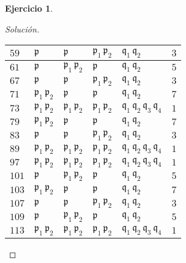 \documentclass{article}
\newcounter{tarea}
\theoremstyle{definition}
\newtheorem{ejercicio}{Ejercicio}[tarea]
\newenvironment{solucion}{\begin{proof}[Solución]}{\end{proof}}
\begin{document}
\begin{ejercicio}
\begin{solucion}
\begin{center}
\begin{tabular}{x{1cm}x{1.5cm}x{1.5cm}x{1.5cm}x{1.5cm}x{1cm}}
\hline
$59$ & $\mathfrak{p}$ & $\mathfrak{p}$ & $\mathfrak{p}_1\,\mathfrak{p}_2$ & $\mathfrak{q}_1\,\mathfrak{q}_2$ & $3$ \tabularnewline
\hline
$61$ & $\mathfrak{p}$ & $\mathfrak{p}_1\,\mathfrak{p}_2$ & $\mathfrak{p}$ & $\mathfrak{q}_1\,\mathfrak{q}_2$ & $5$ \tabularnewline
\hline
$67$ & $\mathfrak{p}$ & $\mathfrak{p}$ & $\mathfrak{p}_1\,\mathfrak{p}_2$ & $\mathfrak{q}_1\,\mathfrak{q}_2$ & $3$ \tabularnewline
\hline
$71$ & $\mathfrak{p}_1\,\mathfrak{p}_2$ & $\mathfrak{p}$ & $\mathfrak{p}$ & $\mathfrak{q}_1\,\mathfrak{q}_2$ & $7$ \tabularnewline
\hline
$73$ & $\mathfrak{p}_1\,\mathfrak{p}_2$ & $\mathfrak{p}_1\,\mathfrak{p}_2$ & $\mathfrak{p}_1\,\mathfrak{p}_2$ & $\mathfrak{q}_1\,\mathfrak{q}_2\,\mathfrak{q}_3\,\mathfrak{q}_4$ & $1$ \tabularnewline
\hline
$79$ & $\mathfrak{p}_1\,\mathfrak{p}_2$ & $\mathfrak{p}$ & $\mathfrak{p}$ & $\mathfrak{q}_1\,\mathfrak{q}_2$ & $7$ \tabularnewline
\hline
$83$ & $\mathfrak{p}$ & $\mathfrak{p}$ & $\mathfrak{p}_1\,\mathfrak{p}_2$ & $\mathfrak{q}_1\,\mathfrak{q}_2$ & $3$ \tabularnewline
\hline
$89$ & $\mathfrak{p}_1\,\mathfrak{p}_2$ & $\mathfrak{p}_1\,\mathfrak{p}_2$ & $\mathfrak{p}_1\,\mathfrak{p}_2$ & $\mathfrak{q}_1\,\mathfrak{q}_2\,\mathfrak{q}_3\,\mathfrak{q}_4$ & $1$ \tabularnewline
\hline
$97$ & $\mathfrak{p}_1\,\mathfrak{p}_2$ & $\mathfrak{p}_1\,\mathfrak{p}_2$ & $\mathfrak{p}_1\,\mathfrak{p}_2$ & $\mathfrak{q}_1\,\mathfrak{q}_2\,\mathfrak{q}_3\,\mathfrak{q}_4$ & $1$ \tabularnewline
\hline
$101$ & $\mathfrak{p}$ & $\mathfrak{p}_1\,\mathfrak{p}_2$ & $\mathfrak{p}$ & $\mathfrak{q}_1\,\mathfrak{q}_2$ & $5$ \tabularnewline
\hline
$103$ & $\mathfrak{p}_1\,\mathfrak{p}_2$ & $\mathfrak{p}$ & $\mathfrak{p}$ & $\mathfrak{q}_1\,\mathfrak{q}_2$ & $7$ \tabularnewline
\hline
$107$ & $\mathfrak{p}$ & $\mathfrak{p}$ & $\mathfrak{p}_1\,\mathfrak{p}_2$ & $\mathfrak{q}_1\,\mathfrak{q}_2$ & $3$ \tabularnewline
\hline
$109$ & $\mathfrak{p}$ & $\mathfrak{p}_1\,\mathfrak{p}_2$ & $\mathfrak{p}$ & $\mathfrak{q}_1\,\mathfrak{q}_2$ & $5$ \tabularnewline
\hline
$113$ & $\mathfrak{p}_1\,\mathfrak{p}_2$ & $\mathfrak{p}_1\,\mathfrak{p}_2$ & $\mathfrak{p}_1\,\mathfrak{p}_2$ & $\mathfrak{q}_1\,\mathfrak{q}_2\,\mathfrak{q}_3\,\mathfrak{q}_4$ & $1$ \tabularnewline
\hline
\end{tabular}
\end{center}

  \end{solucion}
  \fi
\end{ejercicio}

\ifdefined\solutions
\pagebreak
\fi
\end{document}
